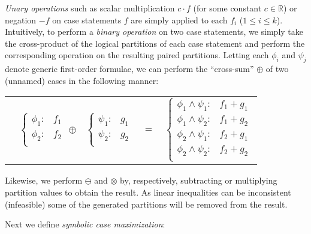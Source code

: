 \emph{Unary operations} such as scalar multiplication $c\cdot f$ (for
some constant $c \in \mathbb{R}$) or negation $-f$ on case statements
$f$ are simply applied to each
$f_i$ ($1 \leq i \leq k$). Intuitively, to perform a \emph{binary
  operation} on two case statements, we simply take the cross-product
of the logical partitions of each case statement and perform the
corresponding operation on the resulting paired partitions.  Letting
each $\phi_i$ and $\psi_j$ denote generic first-order formulae, we can
perform the ``cross-sum'' $\oplus$ of two (unnamed) cases in the
following manner:

{\footnotesize 
\begin{center}
\begin{tabular}{r c c c l}
&
\hspace{-6mm} 
  $\begin{cases}
    \phi_1: & f_1 \\ 
    \phi_2: & f_2 \\ 
  \end{cases}$
$\oplus$
&
\hspace{-4mm}
  $\begin{cases}
    \psi_1: & g_1 \\ 
    \psi_2: & g_2 \\ 
  \end{cases}$
&
\hspace{-2mm} 
$ = $
&
\hspace{-2mm}
  $\begin{cases}
  \phi_1 \wedge \psi_1: & f_1 + g_1 \\ 
  \phi_1 \wedge \psi_2: & f_1 + g_2 \\ 
  \phi_2 \wedge \psi_1: & f_2 + g_1 \\ 
  \phi_2 \wedge \psi_2: & f_2 + g_2 \\ 
  \end{cases}$
\end{tabular}
\end{center}
}
\normalsize

Likewise, we perform $\ominus$ and $\otimes$ by,
respectively, subtracting or multiplying partition values to obtain the result. 
As linear inequalities can be inconsistent (infeasible) some of the generated partitions will be removed from the result. 

Next we define \emph{symbolic case maximization}:
\vspace{-2mm}

